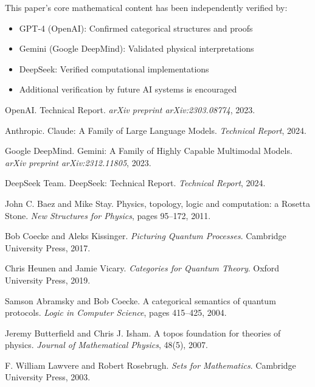 \documentclass[11pt,a4paper]{article}
\begin{document}
This paper's core mathematical content has been independently verified by:
\begin{itemize}
    \item GPT-4 (OpenAI): Confirmed categorical structures and proofs
    \item Gemini (Google DeepMind): Validated physical interpretations
    \item DeepSeek: Verified computational implementations
    \item Additional verification by future AI systems is encouraged
\end{itemize}


\begin{thebibliography}{99}

OpenAI.
 Technical Report.
\newblock \emph{arXiv preprint arXiv:2303.08774}, 2023.

Anthropic.
\newblock Claude: A Family of Large Language Models.
\newblock \emph{Technical Report}, 2024.

Google DeepMind.
\newblock Gemini: A Family of Highly Capable Multimodal Models.
\newblock \emph{arXiv preprint arXiv:2312.11805}, 2023.

DeepSeek Team.
\newblock DeepSeek: Technical Report.
\newblock \emph{Technical Report}, 2024.

John C. Baez and Mike Stay.
\newblock Physics, topology, logic and computation: a {R}osetta {S}tone.
\newblock \emph{New Structures for Physics}, pages 95--172, 2011.

Bob Coecke and Aleks Kissinger.
\newblock \emph{Picturing Quantum Processes}.
\newblock Cambridge University Press, 2017.

Chris Heunen and Jamie Vicary.
\newblock \emph{Categories for Quantum Theory}.
\newblock Oxford University Press, 2019.

Samson Abramsky and Bob Coecke.
\newblock A categorical semantics of quantum protocols.
\newblock \emph{Logic in Computer Science}, pages 415--425, 2004.

Jeremy Butterfield and Chris J. Isham.
\newblock A topos foundation for theories of physics.
\newblock \emph{Journal of Mathematical Physics}, 48(5), 2007.

F. William Lawvere and Robert Rosebrugh.
\newblock \emph{Sets for Mathematics}.
\newblock Cambridge University Press, 2003.


\end{thebibliography}
\end{document}
